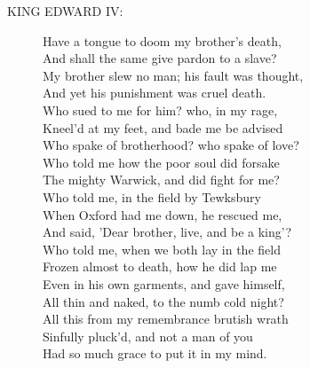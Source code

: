 \documentclass{article}
\begin{document}
\begin{description}
\item[KING EDWARD IV:] 
\hspace{1pt}Have a tongue to doom my brother's death,\\
\hspace{1pt}And shall the same give pardon to a slave?\\
\hspace{1pt}My brother slew no man; his fault was thought,\\
\hspace{1pt}And yet his punishment was cruel death.\\
\hspace{1pt}Who sued to me for him? who, in my rage,\\
\hspace{1pt}Kneel'd at my feet, and bade me be advised\\
\hspace{1pt}Who spake of brotherhood? who spake of love?\\
\hspace{1pt}Who told me how the poor soul did forsake\\
\hspace{1pt}The mighty Warwick, and did fight for me?\\
\hspace{1pt}Who told me, in the field by Tewksbury\\
\hspace{1pt}When Oxford had me down, he rescued me,\\
\hspace{1pt}And said, 'Dear brother, live, and be a king'?\\
\hspace{1pt}Who told me, when we both lay in the field\\
\hspace{1pt}Frozen almost to death, how he did lap me\\
\hspace{1pt}Even in his own garments, and gave himself,\\
\hspace{1pt}All thin and naked, to the numb cold night?\\
\hspace{1pt}All this from my remembrance brutish wrath\\
\hspace{1pt}Sinfully pluck'd, and not a man of you\\
\hspace{1pt}Had so much grace to put it in my mind.\\

\end{description}
\end{document}
